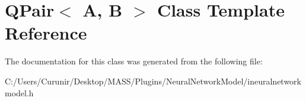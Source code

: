 \hypertarget{class_q_pair}{}\section{Q\+Pair$<$ A, B $>$ Class Template Reference}
\label{class_q_pair}


The documentation for this class was generated from the following file\+:\begin{DoxyCompactItemize}
\item 
C\+:/\+Users/\+Curunir/\+Desktop/\+M\+A\+S\+S/\+Plugins/\+Neural\+Network\+Model/ineuralnetworkmodel.\+h\end{DoxyCompactItemize}
